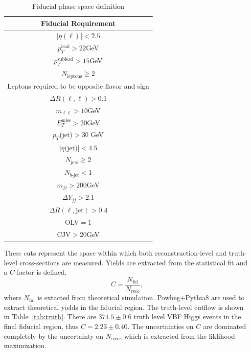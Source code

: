 \begin{table}[!ht]
\centering
\begin{tabular}{|c|}
\hline
Fiducial Requirement \\
\hline
$|\eta(\ell)|<2.5$ \\
$p_T^{\text{lead}}>22$GeV \\
$p_T^{\text{sublead}}>15$GeV \\
$N_{\text{leptons}}\geq2$ \\
Leptons required to be opposite flavor and sign \\
$\Delta R(\ell,\ell) >$0.1 \\
$m_{\ell\ell}>10$GeV \\
$E_T^{\text{miss}}>$20GeV \\
$p_T$(jet)$>$30 GeV \\
$|\eta\text{(jet)}|<4.5$ \\ 
$N_{\text{jets}} \geq 2$ \\
$N_{b\text{-jet}} < 1$ \\
$m_{jj} >200$GeV \\
$\Delta Y_{jj}>2.1$ \\
$\Delta R(\ell,\text{jet})>0.4$ \\
OLV$=1$ \\
CJV$>20$GeV \\
\hline
\end{tabular}
\caption{Fiducial phase space definition}
\label{tab:fiducial}
\end{table}
These cuts represent the space within which both reconstruction-level and truth-level cross-sections are measured. Yields are extracted from the statistical fit and a $C$-factor is defined, 
\begin{equation}
C = \frac{N_\text{fid}}{N_{\text{reco}}},
\end{equation}
where $N_\text{fid}$ is extacted from theoretical simulation. Powheg$+$Pythia8 are used to extract theoretical yields in the fiducial region. The truth-level cutflow is shown in Table~\ref{tab:truth}. There are $371.5\pm0.6$ truth level VBF Higgs events in the final fiducial region, thus $C=2.23\pm 0.40$. The uncertainties on $C$ are dominated completely by the uncertainty on $N_{\text{reco}}$, which is extracted from the liklihood maximization.  

